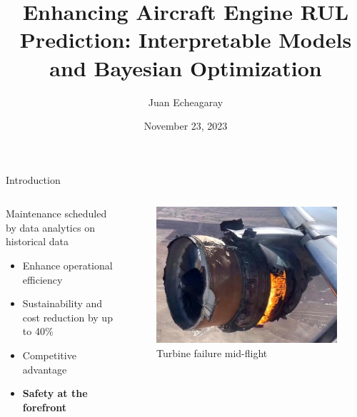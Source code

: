 \documentclass{beamer}
\title{Enhancing Aircraft Engine RUL Prediction: Interpretable Models and Bayesian Optimization}
\author{Juan Echeagaray}
\institute{School of Engineering and Sciences \\ Tecnologico de Monterrey}
\date{November 23, 2023}
\begin{document}
    \frame{\titlepage}

    \begin{frame}{Introduction}
        \begin{columns}
            \begin{column}{0.5\textwidth}
                Maintenance scheduled by data analytics on historical data
                \begin{itemize}
                    \item Enhance operational efficiency
                    \item Sustainability and cost reduction by up to 40\% \cite{brink-2021}
                    \item Competitive advantage
                    \item \textbf{Safety at the forefront}
                \end{itemize}
            \end{column}
            \begin{column}{0.5\textwidth}
                \begin{figure}[!htbp]
                    \centering
                    \includegraphics[scale=0.3]{turbine_failure.jpg}
                    \caption{Turbine failure mid-flight \cite{bbc-news-2021}}
                \end{figure}
            \end{column}
        \end{columns}
    \end{frame}
\end{document}

